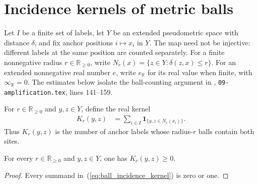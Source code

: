 \section{Incidence kernels of metric balls}
\label{sec:metric_ball_kernel}

Let $I$ be a finite set of labels, let $Y$ be an extended
pseudometric space with distance $\delta$, and fix anchor positions
$i\mapsto x_i$ in $Y$.  The map need not be injective: different
labels at the same position are counted separately.
For a finite nonnegative radius $r\in\mathbb R_{\geq0}$, write
$N_r(x)=\{z\in Y:\delta(z,x)\leq r\}$.
For an extended nonnegative real number $e$, write $e_{\mathbb R}$
for its real value when finite, with $\infty_{\mathbb R}=0$.
The estimates below isolate the ball-counting argument in
\cite{OpenAI2026AreaLaw}, \texttt{09-amplification.tex},
lines 141--159.

\begin{definition}
    \label{def:ball_incidence_kernel}
    \leanok
    For $r\in\mathbb R_{\geq0}$ and $y,z\in Y$, define the real kernel
    \begin{align}
        K_r(y,z) & =\sum_{i\in I}\mathbf 1_{\{y,z\in N_r(x_i)\}}.
        \label{eq:ball_incidence_kernel}
    \end{align}
    Thus $K_r(y,z)$ is the number of anchor labels whose radius-$r$
    balls contain both sites.
\end{definition}

\begin{lemma}
    \label{lem:ball_incidence_nonneg}
    \leanok
    For every $r\in\mathbb R_{\geq0}$ and $y,z\in Y$, one has
    $K_r(y,z)\geq0$.
\end{lemma}
\begin{proof}
    \leanok
    Every summand in~(\ref{eq:ball_incidence_kernel}) is zero or one.
\end{proof}

